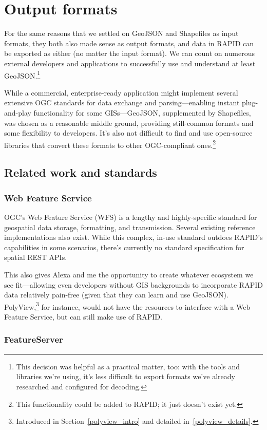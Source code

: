 \section{Output formats}
For the same reasons that we settled on GeoJSON and Shapefiles as input formats, they both also made sense as output formats, and data in RAPID can be exported as either (no matter the input format). We can count on numerous external developers and applications to successfully use and understand at least GeoJSON.\footnote{This decision was helpful as a practical matter, too: with the tools and libraries we're using, it's less difficult to export formats we've already researched and configured for decoding.}

While a commercial, enterprise-ready application might implement several extensive OGC standards for data exchange and parsing---enabling instant plug-and-play functionality for some GISs---GeoJSON, supplemented by Shapefiles, was chosen as a reasonable middle ground, providing still-common formats and some flexibility to developers. It's also not difficult to find and use open-source libraries that convert these formats to other OGC-compliant ones.\footnote{This functionality could be added to RAPID; it just doesn't exist yet.}

\subsection{Related work and standards}
\subsubsection{Web Feature Service}
OGC's Web Feature Service (WFS) is a lengthy and highly-specific standard for geospatial data storage, formatting, and transmission. Several existing reference implementations also exist. While this complex, in-use standard outdoes RAPID's capabilities in some scenarios, there's currently no standard specification for spatial REST APIs.

This also gives Alexa and me the opportunity to create whatever ecosystem we see fit---allowing even developers without GIS backgrounds to incorporate RAPID data relatively pain-free (given that they can learn and use GeoJSON). PolyView,\footnote{Introduced in Section~\ref{polyview_intro} and detailed in~\ref{polyview_details}.} for instance, would not have the resources to interface with a Web Feature Service, but can still make use of RAPID.

\subsubsection{FeatureServer}

